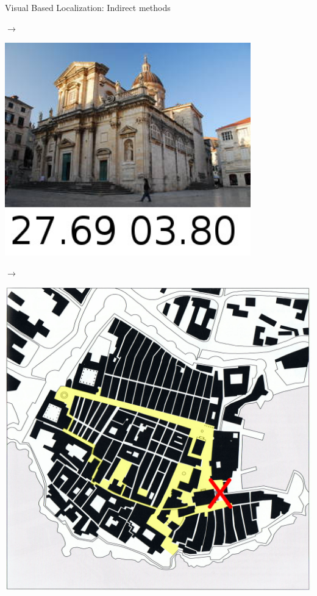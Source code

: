 \begin{frame}{Visual Based Localization: Indirect methods}
{\begin{minipage}{0.3\linewidth}
		\end{minipage}
		\hfill $\rightarrow$ 	\hfill
		\begin{minipage}{0.3\linewidth}
			\centering
			\includegraphics[width=0.8\textwidth]{images/intro_fig/dataset/8.jpg}
		\end{minipage}
	    \hfill $\rightarrow$ 	\hfill
		\begin{minipage}{0.3\linewidth}
			\centering
			\includegraphics[width=\linewidth]{images/intro_fig/dubrovnik_map_marked.jpg}
		\end{minipage}
	}
\end{frame}


